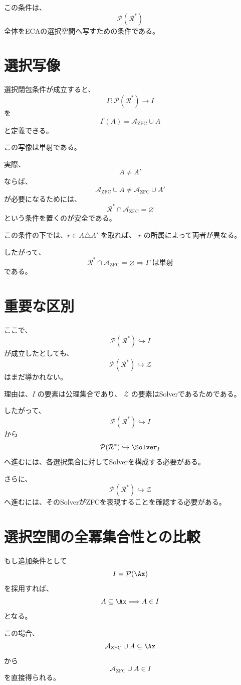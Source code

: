 \documentclass[11pt,a4paper]{article}
\begin{document}
この条件は、
\[
\mathcal P(\mathcal R^*)
\]
全体をECAの選択空間へ写すための条件である。

\section{選択写像}

選択閉包条件が成立すると、
\[
\Gamma:
\mathcal P(\mathcal R^*)
\longrightarrow I
\]
を
\[
\boxed{
\Gamma(A)=\mathcal A_{\mathrm{ZFC}}\cup A
}
\]
と定義できる。

この写像は単射である。

実際、
\[
A\neq A'
\]
ならば、
\[
\mathcal A_{\mathrm{ZFC}}\cup A
\neq
\mathcal A_{\mathrm{ZFC}}\cup A'
\]
が必要になるためには、
\[
\mathcal R^*\cap\mathcal A_{\mathrm{ZFC}}=\varnothing
\]
という条件を置くのが安全である。

この条件の下では、$r\in A\triangle A'$ を取れば、
$r$ の所属によって両者が異なる。

したがって、
\[
\boxed{
\mathcal R^*\cap\mathcal A_{\mathrm{ZFC}}=\varnothing
\Longrightarrow
\Gamma\text{ は単射}
}
\]
である。

\section{重要な区別}

ここで、
\[
\mathcal P(\mathcal R^*)\hookrightarrow I
\]
が成立したとしても、
\[
\mathcal P(\mathcal R^*)\hookrightarrow\mathcal Z
\]
はまだ導かれない。

理由は、$I$ の要素は公理集合であり、
$\mathcal Z$ の要素はSolverであるためである。

したがって、
\[
\mathcal P(\mathcal R^*)
\hookrightarrow I
\]
から
\[
\mathcal P(\mathcal R^*)
\hookrightarrow\Solver_I
\]
へ進むには、各選択集合に対してSolverを構成する必要がある。

さらに、
\[
\mathcal P(\mathcal R^*)
\hookrightarrow\mathcal Z
\]
へ進むには、そのSolverがZFCを表現することを確認する必要がある。

\section{選択空間の全冪集合性との比較}

もし追加条件として
\[
I=\mathcal P(\Ax)
\]
を採用すれば、
\[
A\subseteq\Ax
\Longrightarrow
A\in I
\]
となる。

この場合、
\[
\mathcal A_{\mathrm{ZFC}}\cup A
\subseteq\Ax
\]
から
\[
\mathcal A_{\mathrm{ZFC}}\cup A\in I
\]
を直接得られる。
\end{document}
